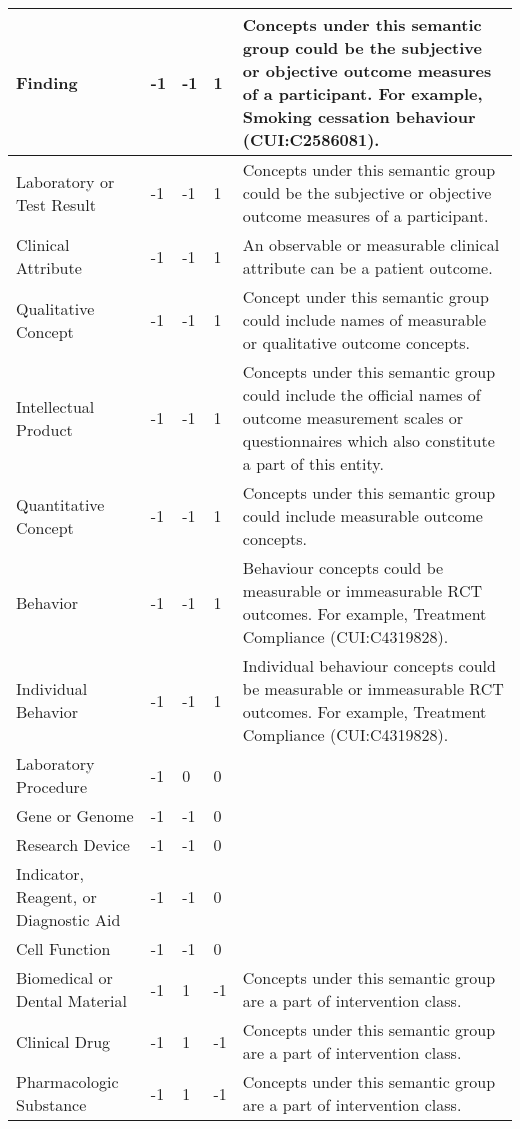 \documentclass[10.7pt,]{article}
\begin{document}
\begin{longtable}{|l|p{0.3cm}|p{0.3cm}|p{0.3cm}|p{7.9cm}|}
        Finding & -1 & -1 & 1 & Concepts under this semantic group could be the subjective or objective outcome measures of a participant. For example, Smoking cessation behaviour (CUI:C2586081). \\ \hline
        Laboratory or Test Result & -1 & -1 & 1 & Concepts under this semantic group could be the subjective or objective outcome measures of a participant. \\ \hline
        Clinical Attribute & -1 & -1 & 1 & An observable or measurable clinical attribute can be a patient outcome. \\ \hline
        Qualitative Concept & -1 & -1 & 1 & Concept under this semantic group could include names of measurable or qualitative outcome concepts. \\ \hline
        Intellectual Product & -1 & -1 & 1 & Concepts under this semantic group could include the official names of outcome measurement scales or questionnaires which also constitute a part of this entity. \\ \hline
        Quantitative Concept & -1 & -1 & 1 & Concepts under this semantic group could include measurable outcome concepts. \\ \hline
        Behavior & -1 & -1 & 1 & Behaviour concepts could be measurable or immeasurable RCT outcomes. For example, Treatment Compliance (CUI:C4319828). \\ \hline
        Individual Behavior & -1 & -1 & 1 & Individual behaviour concepts could be measurable or immeasurable RCT outcomes. For example, Treatment Compliance (CUI:C4319828). \\ \hline
        Laboratory Procedure & -1 & 0 & 0 & ~ \\ \hline
        Gene or Genome & -1 & -1 & 0 & ~ \\ \hline
        Research Device & -1 & -1 & 0 & ~ \\ \hline
        Indicator, Reagent, or Diagnostic Aid & -1 & -1 & 0 & ~ \\ \hline
        Cell Function & -1 & -1 & 0 & ~ \\ \hline
        Biomedical or Dental Material & -1 & 1 & -1 & Concepts under this semantic group are a part of intervention class. \\ \hline
        Clinical Drug & -1 & 1 & -1 & Concepts under this semantic group are a part of intervention class. \\ \hline
        Pharmacologic Substance & -1 & 1 & -1 & Concepts under this semantic group are a part of intervention class. \\ \hline

\end{longtable}
\end{document}
